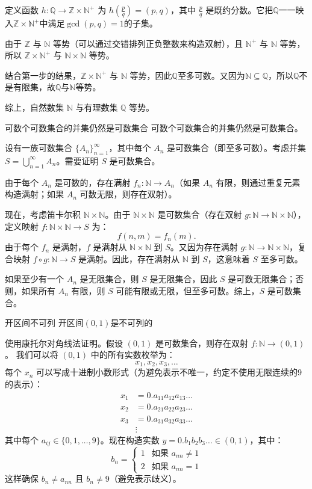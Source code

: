 \documentclass[lang=cn,11pt]{elegantbook}
\begin{document}
定义函数 $h: \mathbb{Q} \to \mathbb{Z} \times \mathbb{N}^+$ 为 $h\left(\frac{p}{q}\right) = (p,q)$，其中 $\frac{p}{q}$ 是既约分数。它把$\mathbb{Q}$一一映入$\mathbb{Z} \times \mathbb{N}^+$中满足$\gcd(p,q)=1$的子集。

由于 $\mathbb{Z}$ 与 $\mathbb{N}$ 等势（可以通过交错排列正负整数来构造双射），且 $\mathbb{N}^+$ 与 $\mathbb{N}$ 等势，所以 $\mathbb{Z} \times \mathbb{N}^+$ 与 $\mathbb{N} \times \mathbb{N}$ 等势。

结合第一步的结果，$\mathbb{Z} \times \mathbb{N}^+$ 与 $\mathbb{N}$ 等势，因此$\mathbb{Q}$至多可数。又因为$\mathbb{N}\subseteq\mathbb{Q}$，所以$\mathbb{Q}$不是有限集，故$\mathbb{Q}$与$\mathbb{N}$等势。

综上，自然数集 $\mathbb{N}$ 与有理数集 $\mathbb{Q}$ 等势。
\begin{theorem}{可数个可数集合的并集仍然是可数集合}
    可数个可数集合的并集仍然是可数集合。
    
    设有一族可数集合 $\{A_n\}_{n=1}^\infty$，其中每个 $A_n$ 是可数集合（即至多可数）。考虑并集 $S = \bigcup_{n=1}^\infty A_n$。需要证明 $S$ 是可数集合。
\end{theorem}
由于每个 $A_n$ 是可数的，存在满射 $f_n: \mathbb{N} \to A_n$（如果 $A_n$ 有限，则通过重复元素构造满射；如果 $A_n$ 可数无限，则存在双射）。

现在，考虑笛卡尔积 $\mathbb{N} \times \mathbb{N}$。由于 $\mathbb{N} \times \mathbb{N}$ 是可数集合（存在双射 $g: \mathbb{N} \to \mathbb{N} \times \mathbb{N}$），定义映射 $f: \mathbb{N} \times \mathbb{N} \to S$ 为：
\[
f(n, m) = f_n(m).
\]
由于每个 $f_n$ 是满射，$f$ 是满射从 $\mathbb{N} \times \mathbb{N}$ 到 $S$。又因为存在满射 $g: \mathbb{N} \to \mathbb{N} \times \mathbb{N}$，复合映射 $f \circ g: \mathbb{N} \to S$ 是满射。因此，存在满射从 $\mathbb{N}$ 到 $S$，这意味着 $S$ 至多可数。

如果至少有一个 $A_n$ 是无限集合，则 $S$ 是无限集合，因此 $S$ 是可数无限集合；否则，如果所有 $A_n$ 有限，则 $S$ 可能有限或无限，但至多可数。综上，$S$ 是可数集合。
\begin{theorem}{开区间不可列}
    开区间$(0,1)$是不可列的
\end{theorem}
使用康托尔对角线法证明。假设 $(0,1)$ 是可数集合，则存在双射 $f: \mathbb{N} \to (0,1)$。
我们可以将 $(0,1)$ 中的所有实数枚举为：
\[
x_1, x_2, x_3, \dots
\]
每个 $x_n$ 可以写成十进制小数形式（为避免表示不唯一，约定不使用无限连续的9的表示）：
\[
\begin{aligned}
x_1 &= 0.a_{11}a_{12}a_{13}\dots \\
x_2 &= 0.a_{21}a_{22}a_{23}\dots \\
x_3 &= 0.a_{31}a_{32}a_{33}\dots \\
&\vdots
\end{aligned}
\]
其中每个 $a_{ij} \in \{0,1,\dots,9\}$。现在构造实数 $y = 0.b_1b_2b_3\dots \in (0,1)$，其中：
\[
b_n = 
\begin{cases}
1 & \text{如果 } a_{nn} \neq 1 \\
2 & \text{如果 } a_{nn} = 1
\end{cases}
\]
这样确保 $b_n \neq a_{nn}$ 且 $b_n \neq 9$（避免表示歧义）。
\end{document}
